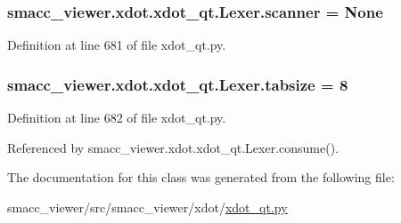 \subsubsection[{\texorpdfstring{scanner}{scanner}}]{\setlength{\rightskip}{0pt plus 5cm}smacc\+\_\+viewer.\+xdot.\+xdot\+\_\+qt.\+Lexer.\+scanner = None\hspace{0.3cm}{\ttfamily [static]}}\hypertarget{classsmacc__viewer_1_1xdot_1_1xdot__qt_1_1Lexer_aed8e203ba6a6926aeaaec5169b14be4a}{}\label{classsmacc__viewer_1_1xdot_1_1xdot__qt_1_1Lexer_aed8e203ba6a6926aeaaec5169b14be4a}


Definition at line 681 of file xdot\+\_\+qt.\+py.

\subsubsection[{\texorpdfstring{tabsize}{tabsize}}]{ smacc\+\_\+viewer.\+xdot.\+xdot\+\_\+qt.\+Lexer.\+tabsize = 8\hspace{0.3cm}{\ttfamily [static]}}\hypertarget{classsmacc__viewer_1_1xdot_1_1xdot__qt_1_1Lexer_a512bd6b3cb3ddefd1776ef45e247ea4b}{}\label{classsmacc__viewer_1_1xdot_1_1xdot__qt_1_1Lexer_a512bd6b3cb3ddefd1776ef45e247ea4b}


Definition at line 682 of file xdot\+\_\+qt.\+py.



Referenced by smacc\+\_\+viewer.\+xdot.\+xdot\+\_\+qt.\+Lexer.\+consume().



The documentation for this class was generated from the following file\+:\begin{DoxyCompactItemize}
\item 
smacc\+\_\+viewer/src/smacc\+\_\+viewer/xdot/\hyperlink{xdot__qt_8py}{xdot\+\_\+qt.\+py}\end{DoxyCompactItemize}
